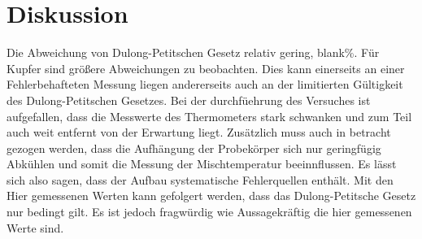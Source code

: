 \section{Diskussion}
\label{sec:Diskussion}
Die Abweichung von Dulong-Petitschen Gesetz relativ gering, blank\%.
Für Kupfer sind größere Abweichungen zu beobachten.
Dies kann einerseits an einer Fehlerbehafteten Messung liegen andererseits auch an der limitierten Gültigkeit des Dulong-Petitschen Gesetzes.
Bei der durchfüehrung des Versuches ist aufgefallen, dass die Messwerte des Thermometers stark schwanken und zum Teil auch weit entfernt von der Erwartung liegt.
Zusätzlich muss auch in betracht gezogen werden, dass die Aufhängung der Probekörper sich nur geringfügig Abkühlen und somit die Messung der Mischtemperatur beeinnflussen.
Es lässt sich also sagen, dass der Aufbau systematische Fehlerquellen enthält.
Mit den Hier gemessenen Werten kann gefolgert werden, dass das Dulong-Petitsche Gesetz nur bedingt gilt.
Es ist jedoch fragwürdig wie Aussagekräftig die hier gemessenen Werte sind.
  
